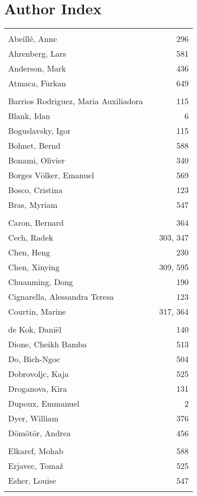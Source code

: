 \documentclass{easychair}
\begin{document}
\section*{Author Index}
\begin{longtable}{lp{10em}r}
\\
\\
Abeill\'e, Anne & & 296 
\\
Ahrenberg, Lars & & 581 
\\
Anderson, Mark & & 436 
\\
Atmaca, Furkan & & 649 
\\
\\
Barrios Rodriguez, Maria Auxiliadora & & 115 
\\
Blank, Idan & & 6 
\\
Boguslavsky, Igor & & 115 
\\
Bohnet, Bernd & & 588 
\\
Bonami, Olivier & & 340 
\\
Borges V\"olker, Emanuel & & 569 
\\
Bosco, Cristina & & 123 
\\
Bras, Myriam & & 547 
\\
\\
Caron, Bernard & & 364 
\\
Cech, Radek & & 303, 347 
\\
Chen, Heng & & 230 
\\
Chen, Xinying & & 309, 595 
\\
Chuanming, Dong & & 190 
\\
Cignarella, Alessandra Teresa & & 123 
\\
Courtin, Marine & & 317, 364 
\\
\\
de Kok, Dani\"el & & 140 
\\
Dione, Cheikh Bamba & & 513 
\\
Do, Bich-Ngoc & & 504 
\\
Dobrovoljc, Kaja & & 525 
\\
Droganova, Kira & & 131 
\\
Dupoux, Emmanuel & & 2 
\\
Dyer, William & & 376 
\\
D\"om\"ot\"or, Andrea & & 456 
\\
\\
Elkaref, Mohab & & 588 
\\
Erjavec, Toma\v{z} & & 525 
\\
Esher, Louise & & 547 
\\
\\

\end{longtable}
\end{document}
